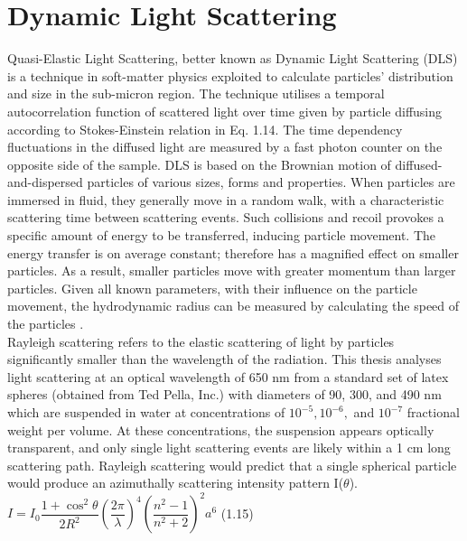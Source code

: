 \vspace{10mm}

\section{Dynamic Light Scattering}

Quasi-Elastic Light Scattering, better known as Dynamic Light Scattering (DLS) is a technique in soft-matter physics exploited to calculate particles' distribution and size in the sub-micron region. The technique utilises a temporal autocorrelation function of scattered light over time given by particle diffusing according to Stokes-Einstein relation in Eq. 1.14. The time dependency fluctuations in the diffused light are measured by a fast photon counter on the opposite side of the sample. DLS is based on the Brownian motion of diffused-and-dispersed particles of various sizes, forms and properties. When particles are immersed in fluid, they generally move in a random walk, with a characteristic scattering time between scattering events. Such collisions and recoil provokes a specific amount of energy to be transferred, inducing particle movement. The energy transfer is on average constant; therefore has a magnified effect on smaller particles. As a result, smaller particles move with greater momentum than larger particles. Given all known parameters, with their influence on the particle movement, the hydrodynamic radius can be measured by calculating the speed of the particles \citep{Reif}.\\

Rayleigh scattering refers to the elastic scattering of light by particles significantly smaller than the wavelength of the radiation. This thesis analyses light scattering at an optical wavelength of 650 nm from a standard set of latex spheres (obtained from Ted Pella, Inc.) with diameters of 90, 300, and 490  nm which are suspended in water at concentrations of $10^{-5}, 10^{-6},$ and $10^{-7}$ fractional weight per volume. At these concentrations, the suspension appears optically transparent, and only single light scattering events are likely within a 1 cm long scattering path. Rayleigh scattering would predict that a single spherical particle would produce an azimuthally scattering intensity pattern I($\theta$). \\

\vspace{7mm}
\hspace{52mm} $I = I_0 \dfrac{1 + \cos ^2\theta}{2R^2} \left( \dfrac{2\pi}{\lambda}\right)^4 \left(\dfrac{n^2 -1}{n^2+2} \right)^2 a^6$ \hspace*{0pt}\hfill (1.15) 
\vspace{7mm}

